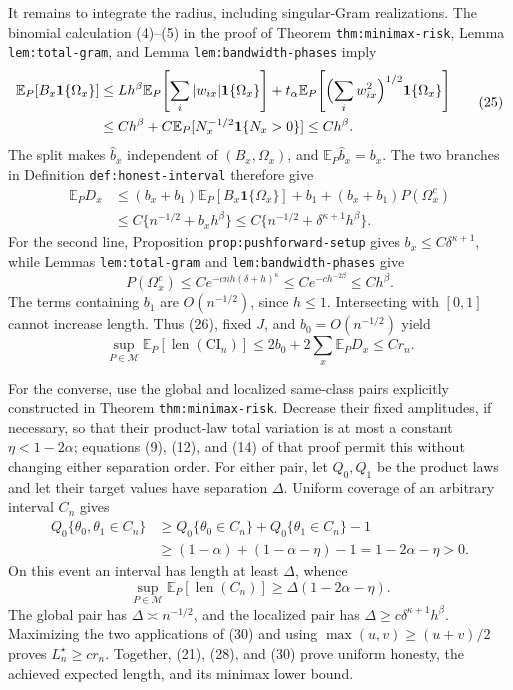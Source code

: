 It remains to integrate the radius, including singular-Gram realizations.  The binomial calculation (4)--(5) in the proof of Theorem \texttt{thm:minimax-risk}, Lemma \texttt{lem:total-gram}, and Lemma \texttt{lem:bandwidth-phases} imply
\[
 \begin{aligned}
 \mathbb E_P[B_x\mathbf 1\{\Omega_x\}]
 &\leq Lh^\beta\mathbb E_P\!\left[\sum_i|w_{ix}|\mathbf 1\{\Omega_x\}\right]
 +t_\alpha\mathbb E_P\!\left[\Bigl(\sum_iw_{ix}^2\Bigr)^{1/2}\mathbf 1\{\Omega_x\}\right]\\
 &\leq Ch^\beta+C\mathbb E_P[N_x^{-1/2}\mathbf 1\{N_x>0\}]
 \leq Ch^\beta. 
 \end{aligned} \tag{25}
\]
The split makes \(\widehat b_x\) independent of \((B_x,\Omega_x)\), and \(\mathbb E_P\widehat b_x=b_x\).  The two branches in Definition \texttt{def:honest-interval} therefore give
\[
 \begin{aligned}
 \mathbb E_PD_x
 &\leq(b_x+b_1)\mathbb E_P[B_x\mathbf 1\{\Omega_x\}]+b_1
 +(b_x+b_1)P(\Omega_x^c)\\
 &\leq C\{n^{-1/2}+b_xh^\beta\}
 \leq C\{n^{-1/2}+\delta^{\kappa+1}h^\beta\}. 
 \end{aligned} \tag{26}
\]
For the second line, Proposition \texttt{prop:pushforward-setup} gives \(b_x\leq C\delta^{\kappa+1}\), while Lemmas \texttt{lem:total-gram} and \texttt{lem:bandwidth-phases} give
\[
 P(\Omega_x^c)\leq Ce^{-cnh(\delta+h)^\kappa}
 \leq Ce^{-ch^{-2\beta}}\leq Ch^\beta. \tag{27}
\]
The terms containing \(b_1\) are \(O(n^{-1/2})\), since \(h\leq1\).  Intersecting with \([0,1]\) cannot increase length.  Thus (26), fixed \(J\), and \(b_0=O(n^{-1/2})\) yield
\[
 \sup_{P\in\mathcal M}\mathbb E_P[\operatorname{len}(\mathrm{CI}_n)]
 \leq2b_0+2\sum_x\mathbb E_PD_x\leq Cr_n. \tag{28}
\]

For the converse, use the global and localized same-class pairs explicitly constructed in Theorem \texttt{thm:minimax-risk}.  Decrease their fixed amplitudes, if necessary, so that their product-law total variation is at most a constant \(\eta<1-2\alpha\); equations (9), (12), and (14) of that proof permit this without changing either separation order.  For either pair, let \(Q_0,Q_1\) be the product laws and let their target values have separation \(\Delta\).  Uniform coverage of an arbitrary interval \(C_n\) gives
\[
 \begin{aligned}
 Q_0\{\theta_0,\theta_1\in C_n\}
 &\geq Q_0\{\theta_0\in C_n\}+Q_0\{\theta_1\in C_n\}-1\\
 &\geq(1-\alpha)+(1-\alpha-\eta)-1
 =1-2\alpha-\eta>0. 
 \end{aligned} \tag{29}
\]
On this event an interval has length at least \(\Delta\), whence
\[
 \sup_{P\in\mathcal M}\mathbb E_P[\operatorname{len}(C_n)]
 \geq\Delta(1-2\alpha-\eta). \tag{30}
\]
The global pair has \(\Delta\asymp n^{-1/2}\), and the localized pair has \(\Delta\geq c\delta^{\kappa+1}h^\beta\).  Maximizing the two applications of (30) and using \(\max(u,v)\geq(u+v)/2\) proves \(L_n^\star\geq cr_n\).  Together, (21), (28), and (30) prove uniform honesty, the achieved expected length, and its minimax lower bound.
